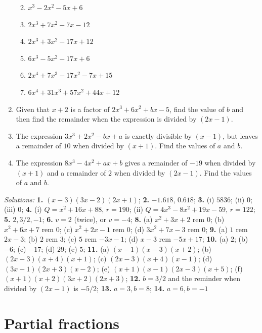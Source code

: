 \documentclass[
  12pt,
  oneside]{book}
\providecommand{\tightlist}{%
  \setlength{\itemsep}{0pt}\setlength{\parskip}{0pt}}
\theoremstyle{definition}
\theoremstyle{definition}
\theoremstyle{definition}
\theoremstyle{definition}
\theoremstyle{remark}
\begin{document}
\begin{enumerate}
  \begin{enumerate}
  \def\labelenumii{\alph{enumii})}
  \tightlist
  \item
    \(x^3 - 2x^2 - 5x + 6\)
  \item
    \(2x^3 + 7x^2 - 7x - 12\)
  \item
    \(2x^3 + 3x^2 - 17x + 12\)
  \item
    \(6x^3 - 5x^2 - 17x + 6\)
  \item
    \(2x^4 + 7x^3 - 17x^2 -7x + 15\)
  \item
    \(6x^4 + 31x^3 + 57x^2 + 44x + 12\)
  \end{enumerate}
\item
  Given that \(x + 2\) is a factor of \(2x^3 + 6x^2 + bx - 5\), find the value of \(b\) and then find the remainder when the expression is divided by \((2x - 1)\).
\item
  The expression \(3x^3 + 2x^2 - bx + a\) is exactly divisible by \((x - 1)\), but leaves a remainder of \(10\) when divided by \((x + 1)\). Find the values of \(a\) and \(b\).
\item
  The expression \(8x^3 - 4x^2 + ax + b\) gives a remainder of \(-19\) when divided by \((x + 1)\) and a remainder of \(2\) when divided by \((2x - 1)\). Find the values of \(a\) and \(b\).
\end{enumerate}

\emph{Solutions:}
\textbf{1.} \((x-3)(3x-2)(2x+1)\);
\textbf{2.} \(-1.618\), \(0.618\);
\textbf{3.} (i) \(5836\); (ii) \(0\); (iii) \(0\);
\textbf{4.} (i) \(Q=x^2+16x+88\), \(r=190\); (ii) \(Q=4x^3-8x^2+19x-59\), \(r=122\);
\textbf{5.} \(2,3/2,-1\);
\textbf{6.} \(v=2\) (twice), or \(v=-4\);
\textbf{8.} (a) \(x^2+3x+2\) rem \(0\); (b) \(x^2+6x+7\) rem \(0\); (c) \(x^2+2x-1\) rem \(0\); (d) \(3x^2+7x-3\) rem \(0\);
\textbf{9.} (a) \(1\) rem \(2x-3\); (b) \(2\) rem \(3\); (c) \(5\) rem \(-3x-1\); (d) \(x-3\) rem \(-5x+17\);
\textbf{10.} (a) \(2\); (b) \(-6\); (c) \(-17\); (d) \(29\); (e) \(5\);
\textbf{11.} (a) \((x -1)(x - 3)(x + 2)\); (b) \((2x - 3)(x + 4)(x + 1)\); (c) \((2x - 3)(x + 4)(x - 1)\); (d) \((3x - 1)(2x + 3)(x - 2)\); (e) \((x + 1)(x - 1)(2x - 3)(x + 5)\); (f) \((x + 1)(x + 2)(3x + 2)(2x + 3)\);
\textbf{12.} \(b = 3/2\) and the reminder when divided by \((2x-1)\) is \(-5/2\);
\textbf{13.} \(a=3, b=8\);
\textbf{14.} \(a=6,b=-1\)

\hypertarget{partial-fractions}{%
\chapter{Partial fractions}\label{partial-fractions}}
\end{document}
